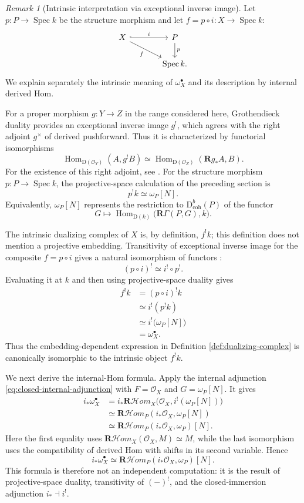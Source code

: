 \documentclass[11pt,a4paper]{article}
\theoremstyle{definition}
\theoremstyle{remark}
\newtheorem{remark}[theorem]{Remark}
\newcommand{\OO}{\mathcal O}
\newcommand{\Spec}{\operatorname{Spec}}
\newcommand{\Hom}{\operatorname{Hom}}
\newcommand{\RshHom}{\mathbf R\!\mathcal H\!om}
\newcommand{\RGamma}{\mathbf R\Gamma}
\newcommand{\D}{\mathrm D}
\newcommand{\Dbcoh}{\mathrm D^b_{\mathrm{coh}}}
\begin{document}
\begin{remark}[Intrinsic interpretation via exceptional inverse image]
Let $p:P\to\Spec k$ be the structure morphism and let
$f=p\circ i:X\to\Spec k$:
\[
\begin{tikzcd}[column sep=large]
  X \arrow[r,hook,"i"] \arrow[dr,"f"'] & P \arrow[d,"p"] \\
  & \Spec k.
\end{tikzcd}
\]
We explain separately the intrinsic meaning of $\omega_X^\bullet$ and its
description by internal derived Hom.

For a proper morphism $g:Y\to Z$ in the range considered here, Grothendieck
duality provides an exceptional inverse image $g^!$, which agrees with the
right adjoint $g^\times$ of derived pushforward. Thus it is characterized by
functorial isomorphisms
\[
  \Hom_{\D(\OO_Y)}(A,g^!B)
  \simeq
  \Hom_{\D(\OO_Z)}(\mathbf Rg_*A,B).
\]
For the existence of this right adjoint, see \cite[Tag 0A9E]{Stacks}.
For the structure morphism $p:P\to\Spec k$, the projective-space calculation
of the preceding section is
\[
  p^!k\simeq\omega_P[N].
\]
Equivalently, $\omega_P[N]$ represents the restriction to $\Dbcoh(P)$ of the
functor
\[
  G\longmapsto
  \Hom_{\D(k)}\bigl(\RGamma(P,G),k\bigr).
\]

The intrinsic dualizing complex of $X$ is, by definition, $f^!k$; this
definition does not mention a projective embedding. Transitivity of
exceptional inverse image for the composite $f=p\circ i$ gives a natural
isomorphism of functors \cite[Tag 0ATX]{Stacks}:
\[
  (p\circ i)^!\simeq i^!\circ p^!.
\]
Evaluating it at $k$ and then using projective-space duality gives
\begin{align*}
  f^!k
  &=(p\circ i)^!k\\
  &\simeq i^!(p^!k)\\
  &\simeq i^!\bigl(\omega_P[N]\bigr)\\
  &=\omega_X^\bullet.
\end{align*}
Thus the embedding-dependent expression in Definition
\ref{def:dualizing-complex} is canonically isomorphic to the intrinsic object
$f^!k$.

We next derive the internal-Hom formula. Apply the internal adjunction
\eqref{eq:closed-internal-adjunction} with $F=\OO_X$ and
$G=\omega_P[N]$. It gives
\begin{align*}
  i_*\omega_X^\bullet
  &=i_*\RshHom_X\bigl(\OO_X,i^!(\omega_P[N])\bigr)\\
  &\simeq\RshHom_P(i_*\OO_X,\omega_P[N])\\
  &\simeq\RshHom_P(i_*\OO_X,\omega_P)[N].
\end{align*}
Here the first equality uses
$\RshHom_X(\OO_X,M)\simeq M$, while the last isomorphism uses the
compatibility of derived Hom with shifts in its second variable. Hence
\begin{equation}\label{eq:intrinsic-dualizing-complex}
  \boxed{
  i_*\omega_X^\bullet
  \simeq
  \RshHom_P(i_*\OO_X,\omega_P)[N].
  }
\end{equation}
This formula is therefore not an independent computation: it is the result
of projective-space duality, transitivity of $(-)^!$, and the closed-immersion
adjunction $i_*\dashv i^!$.


\end{remark}
\end{document}
